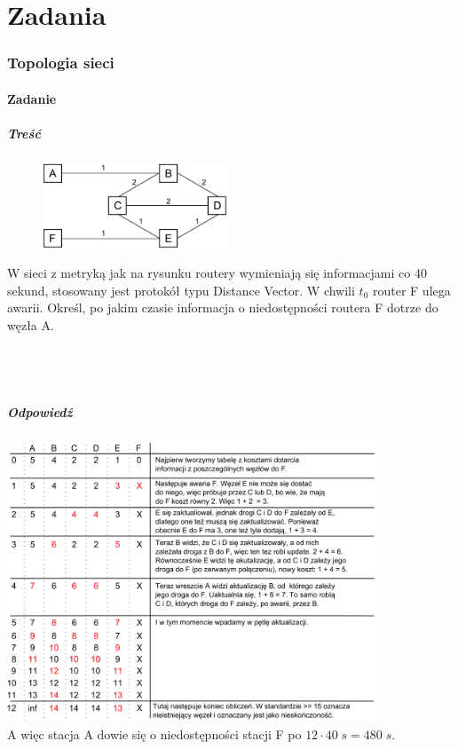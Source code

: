 
\newpage
\part{Zadania}
\section{Topologia sieci}
	\subsection{Zadanie}
		\subsubsection{Treść}
			\begin{figure}
				\includegraphics[width=5.5cm]{./images/zadanie02.pdf}
			\end{figure} 
			W sieci z metryką jak na rysunku routery wymieniają się informacjami co 40 sekund, stosowany jest protokół typu Distance Vector. W chwili $ t_0 $ router F ulega awarii. Określ, po jakim czasie informacja o niedostępności routera F dotrze do węzła A.\\\\\\\\
		\subsubsection{Odpowiedź}
			\includegraphics[width=11.0cm]{./images/zadanie03.pdf}\\
			A więc stacja A dowie się o niedostępności stacji F po $ 12\cdot 40\;s=480\;s $.
\newpage
